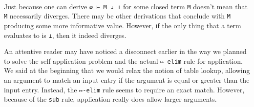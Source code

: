 \begin{fence}
\begin{code}%
\>[0]\AgdaSpace{}%
\AgdaSymbol{:}\AgdaSpace{}%
\AgdaSpace{}%
\AgdaSpace{}%
\AgdaSpace{}%
\AgdaSpace{}%
\<%
\\
\>[0]\AgdaSpace{}%
\AgdaSymbol{=}\AgdaSpace{}%
\<%
\end{code}
\end{fence}

Just because one can derive \texttt{∅\ ⊢\ M\ ↓\ ⊥} for some closed term
\texttt{M} doesn't mean that \texttt{M} necessarily diverges. There may
be other derivations that conclude with \texttt{M} producing some more
informative value. However, if the only thing that a term evaluates to
is \texttt{⊥}, then it indeed diverges.

An attentive reader may have noticed a disconnect earlier in the way we
planned to solve the self-application problem and the actual
\texttt{↦-elim} rule for application. We said at the beginning that we
would relax the notion of table lookup, allowing an argument to match an
input entry if the argument is equal or greater than the input entry.
Instead, the \texttt{↦-elim} rule seems to require an exact match.
However, because of the \texttt{sub} rule, application really does allow
larger arguments.

